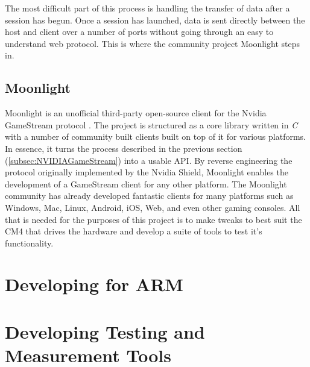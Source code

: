 The most difficult part of this process is handling the transfer of data after a session has begun.
Once a session has launched, data is sent directly between the host and client over a number of ports without going through an easy to understand web protocol.
This is where the community project Moonlight steps in.

\subsection{Moonlight}\label{subsec:Moonlight}

Moonlight is an unofficial third-party open-source client for the Nvidia GameStream protocol \cite{moonlight}.
The project is structured as a core library written in \emph{C} with a number of community built clients built on top of it for various platforms.
In essence, it turns the process described in the previous section (\ref{subsec:NVIDIAGameStream}) into a usable API.
By reverse engineering the protocol originally implemented by the Nvidia Shield, Moonlight enables the development of a GameStream client for any other platform.
The Moonlight community has already developed fantastic clients for many platforms such as Windows, Mac, Linux, Android, iOS, Web, and even other gaming consoles.
All that is needed for the purposes of this project is to make tweaks to best suit the CM4 that drives the hardware and develop a suite of tools to test it's functionality.


\section{Developing for ARM}\label{sec:DevelopingForARM}

\todosection


\section{Developing Testing and Measurement Tools}\label{sec:DevelopingTestingAndMeasurementTools}

\todosection